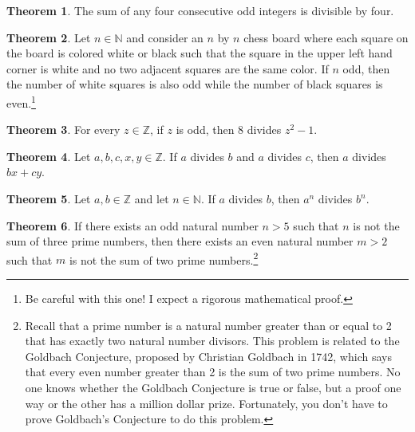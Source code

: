 \documentclass[11pt]{article}
\theoremstyle{definition}
\newtheorem{theorem}{Theorem}
\begin{document}
\begin{theorem}
The sum of any four consecutive odd integers is divisible by four.
\end{theorem}

\begin{theorem}
Let $n\in\mathbb{N}$ and consider an $n$ by $n$ chess board where each square on the board is colored white or black such that the square in the upper left hand corner is white and no two adjacent squares are the same color.  If $n$ odd, then the number of white squares is also odd while the number of black squares is even.\footnote{Be careful with this one!  I expect a rigorous mathematical proof.}

\end{theorem}


\begin{theorem}
For every $z\in\mathbb{Z}$, if $z$ is odd, then 8 divides $z^{2}-1$.
\end{theorem}

\begin{theorem}
Let $a,b,c,x,y\in\mathbb{Z}$. If $a$ divides $b$ and $a$ divides $c$, then $a$ divides $bx+cy$.
\end{theorem}

\begin{theorem}
Let $a,b\in\mathbb{Z}$ and let $n\in\mathbb{N}$.  If $a$ divides $b$, then $a^{n}$ divides $b^{n}$.
\end{theorem}


\begin{theorem}
If there exists an odd natural number $n>5$ such that $n$ is not the sum of three prime numbers, then there exists an even natural number $m>2$ such that $m$ is not the sum of two prime numbers.\footnote{Recall that a prime number is a natural number greater than or equal to 2 that has exactly two natural number divisors.  This problem is related to the Goldbach Conjecture, proposed by Christian Goldbach in 1742, which says that every even number greater than 2 is the sum of two prime numbers.  No one knows whether the Goldbach Conjecture is true or false, but a proof one way or the other has a million dollar prize.  Fortunately, you don't have to prove Goldbach's Conjecture to do this problem.}
\end{theorem}
\end{document}
